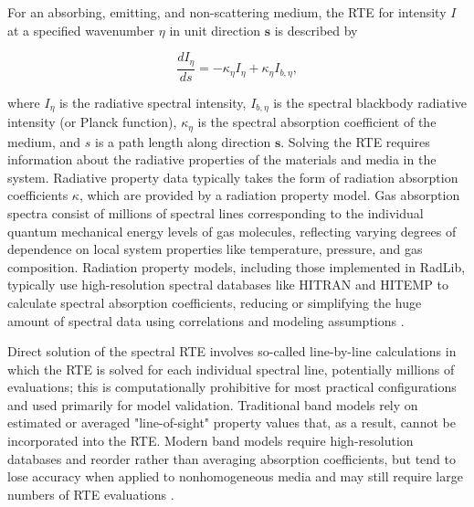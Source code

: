 \documentclass[preprint,12pt]{elsarticle}
\newcounter{bla}
\begin{document}
For an absorbing, emitting, and non-scattering medium, the RTE for intensity $I$ at a specified wavenumber $\eta$ in unit direction $\mathbf{s}$ is described by
% 
\begin{linenomath}
\begin{equation} \label{e:RTE_general}
    \frac{dI_{\eta}}{ds} = -\kappa_{\eta}I_{\eta} + \kappa_{\eta}I_{b,\eta},
\end{equation}
\end{linenomath}
%
where $I_{\eta}$ is the radiative spectral intensity, $I_{b,\eta}$ is the spectral blackbody radiative intensity (or Planck function), $\kappa_{\eta}$ is the spectral absorption coefficient of the medium, and $s$ is a path length along direction $\mathbf{s}$. Solving the RTE requires information about the radiative properties of the materials and media in the system. Radiative property data typically takes the form of radiation absorption coefficients $\kappa$, which are provided by a radiation property model. Gas absorption spectra consist of millions of spectral lines corresponding to the individual quantum mechanical energy levels of gas molecules, reflecting varying degrees of dependence on local system properties like temperature, pressure, and gas composition. Radiation property models, including those implemented in RadLib, typically use high-resolution spectral databases like HITRAN and HITEMP \cite{Rothman_2010} to calculate spectral absorption coefficients, reducing or simplifying the huge amount of spectral data using correlations and modeling assumptions \citep{Zhang_2002b}. 

Direct solution of the spectral RTE involves so-called line-by-line calculations in which the RTE is solved for each individual spectral line, potentially millions of evaluations; this is computationally prohibitive for most practical configurations and used primarily for model validation. Traditional band models rely on estimated or averaged "line-of-sight" property values that, as a result, cannot be incorporated into the RTE. Modern band models require high-resolution databases and reorder rather than averaging absorption coefficients, but tend to lose accuracy when applied to nonhomogeneous media and may still require large numbers of RTE evaluations \citep{Modest_2016}. 
\end{document}
